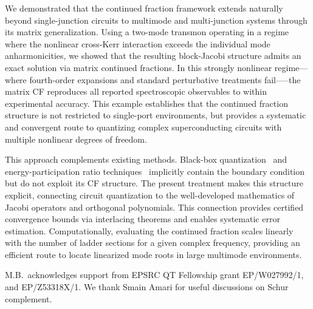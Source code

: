 \documentclass[reprint, floatfix, superscriptaddress, amsmath, amssymb, longbibliography]{revtex4-2}
\begin{document}
We demonstrated that the continued fraction framework extends naturally beyond single-junction circuits to multimode and multi-junction systems through its matrix generalization. Using a two-mode transmon operating in a regime where the nonlinear cross-Kerr interaction exceeds the individual mode anharmonicities, we showed that the resulting block-Jacobi structure admits an exact solution via matrix continued fractions. In this strongly nonlinear regime—where fourth-order expansions and standard perturbative treatments fail—--the matrix CF reproduces all reported spectroscopic observables to within experimental accuracy. This example establishes that the continued fraction structure is not restricted to single-port environments, but provides a systematic and convergent route to quantizing complex superconducting circuits with multiple nonlinear degrees of freedom.

This approach complements existing methods. Black-box quantization~\cite{Nigg2012} and energy-participation ratio techniques~\cite{Minev2021} implicitly contain the boundary condition but do not exploit its CF structure. The present treatment makes this structure explicit, connecting circuit quantization to the well-developed mathematics of Jacobi operators and orthogonal polynomials. This connection provides certified convergence bounds via interlacing theorems and enables systematic error estimation. Computationally, evaluating the continued fraction scales linearly with the number of ladder sections for a given complex frequency, providing an efficient route to locate linearized mode roots in large multimode environments.





\begin{acknowledgments}
M.B.~acknowledges support from EPSRC QT Fellowship grant EP/W027992/1, and EP/Z53318X/1. We thank Smain Amari for useful discussions on Schur complement.
\end{acknowledgments}



\appendix


\end{document}
